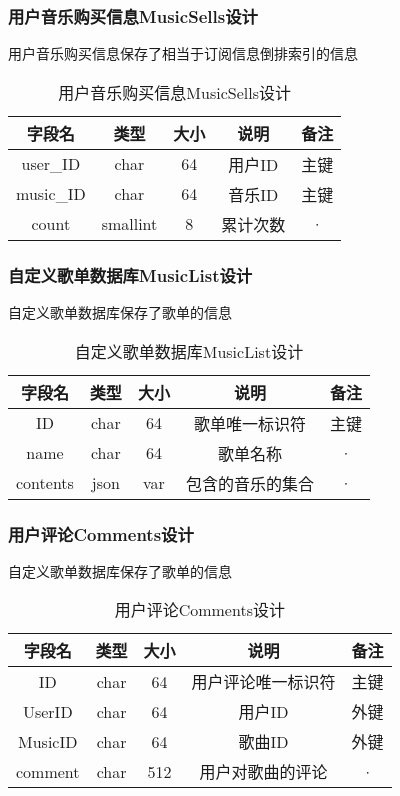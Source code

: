 \subsubsection{用户音乐购买信息MusicSells设计}

用户音乐购买信息保存了相当于订阅信息倒排索引的信息

\begin{table}[htbp]
	\centering
	\caption{用户音乐购买信息MusicSells设计} \label{tab:music-sell-database}
	\begin{tabular}{|c|c|c|c|c|}
		\hline
		字段名 & 类型 & 大小 & 说明 & 备注 \\
		\hline
		user\_ID & char & 64 & 用户ID & 主键\\
		\hline
		music\_ID & char & 64 & 音乐ID & 主键 \\
		\hline
		count & smallint & 8 & 累计次数  & · \\
		\hline
	\end{tabular}
\end{table}

\subsubsection{自定义歌单数据库MusicList设计}

自定义歌单数据库保存了歌单的信息

\begin{table}[htbp]
	\centering
	\caption{自定义歌单数据库MusicList设计} \label{tab:music-list-database}
	\begin{tabular}{|c|c|c|c|c|}
		\hline
		字段名 & 类型 & 大小 & 说明 & 备注 \\
		\hline
		ID & char & 64 & 歌单唯一标识符 & 主键\\
		\hline
		name & char & 64 & 歌单名称 & · \\
		\hline
		contents & json & var & 包含的音乐的集合  & · \\
		\hline
	\end{tabular}
\end{table}

\subsubsection{用户评论Comments设计}

自定义歌单数据库保存了歌单的信息

\begin{table}[htbp]
	\centering
	\caption{用户评论Comments设计} \label{tab:comments-database}
	\begin{tabular}{|c|c|c|c|c|}
		\hline
		字段名 & 类型 & 大小 & 说明 & 备注 \\
		\hline
		ID & char & 64 & 用户评论唯一标识符 & 主键 \\
		\hline
		UserID & char & 64 & 用户ID & 外键 \\
		\hline
		MusicID & char & 64 & 歌曲ID & 外键 \\
		\hline
		comment & char & 512 & 用户对歌曲的评论  & · \\
		\hline
	\end{tabular}
\end{table}

